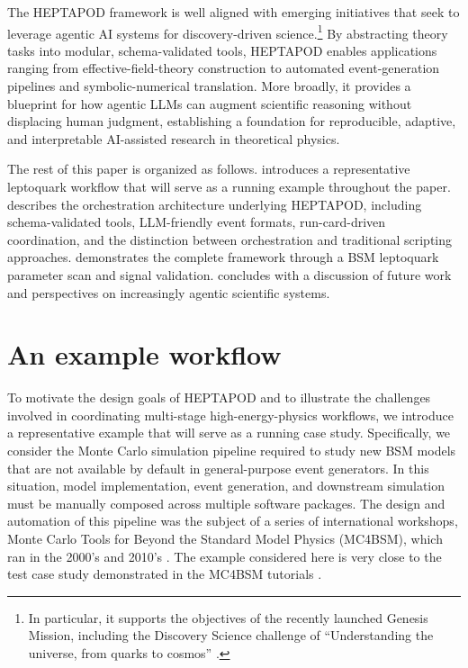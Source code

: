 \documentclass[11pt,oneside]{article}
\numberwithin{equation}{section}
\newcommand{\pkgname}{HEPTAPOD\xspace}
\begin{document}
The HEPTAPOD framework is well aligned with emerging initiatives that seek to leverage agentic AI systems for discovery-driven science.\footnote{In particular, it supports the objectives of the recently launched Genesis Mission, including the Discovery Science challenge of ``Understanding the universe, from quarks to cosmos'' \cite{DiscoveryScience}.} 
By abstracting theory tasks into modular, schema-validated tools, \pkgname enables applications ranging from effective-field-theory construction to automated event-generation pipelines and symbolic-numerical translation. 
More broadly, it provides a blueprint for how agentic LLMs can augment scientific reasoning without displacing human judgment, establishing a foundation for reproducible, adaptive, and interpretable AI-assisted research in theoretical physics.

The rest of this paper is organized as follows.
 introduces a representative leptoquark workflow that will serve as a running example 
throughout the paper. 
 describes the orchestration architecture underlying \pkgname, including schema-validated tools, LLM-friendly event formats, run-card-driven coordination, and the distinction between orchestration and traditional scripting approaches. 
 demonstrates the complete framework through a BSM leptoquark parameter scan and signal validation. 
 concludes with a discussion of future work and perspectives on increasingly agentic scientific systems.

\section{An example workflow}
\label{sec:example}

To motivate the design goals of \pkgname and to illustrate the challenges involved in coordinating multi-stage high-energy-physics workflows, we introduce a representative example that will serve as a running case study. 
Specifically, we consider the Monte Carlo simulation pipeline required to study new BSM models that are not available by default in general-purpose event generators. 
In this situation, model implementation, event generation, and downstream simulation must be manually composed across multiple software packages. 
The design and automation of this pipeline was the subject of a series of international workshops, Monte Carlo Tools for Beyond the Standard Model Physics (MC4BSM), which ran in the 2000's and 2010's \cite{MC4BSM}. The example considered here is very close to the test case study demonstrated in the MC4BSM tutorials \cite{Ask:2012sm}.
\end{document}
